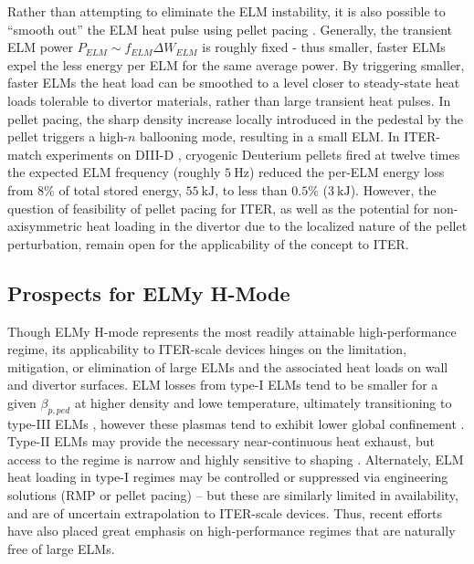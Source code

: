 Rather than attempting to eliminate the ELM instability, it is also possible to ``smooth out'' the ELM heat pulse using pellet pacing \cite{Baylor2013}.  Generally, the transient ELM power $P_{ELM} \sim f_{ELM} \Delta W_{ELM}$ is roughly fixed - thus smaller, faster ELMs expel the less energy per ELM for the same average power.  By triggering smaller, faster ELMs the heat load can be smoothed to a level closer to steady-state heat loads tolerable to divertor materials, rather than large transient heat pulses.  In pellet pacing, the sharp density increase locally introduced in the pedestal by the pellet triggers a high-$n$ ballooning mode, resulting in a small ELM.  In ITER-match experiments on DIII-D \cite{Baylor2013}, cryogenic Deuterium pellets fired at twelve times the expected ELM frequency (roughly $\SI{5}{\hertz}$) reduced the per-ELM energy loss from $8\%$ of total stored energy, $\SI{55}{\kilo\joule}$, to less than $0.5\%$ ($\SI{3}{\kilo\joule}$).  However, the question of feasibility of pellet 
pacing for ITER, as well as the potential for non-axisymmetric heat loading in the divertor due to the localized nature of the pellet perturbation, remain open for the applicability of the concept to ITER.

\subsection{Prospects for ELMy H-Mode}\label{subsec:hcr_elmy_prospects}

Though ELMy H-mode represents the most readily attainable high-performance regime, its applicability to ITER-scale devices hinges on the limitation, mitigation, or elimination of large ELMs and the associated heat loads on wall and divertor surfaces.  ELM losses from type-I ELMs tend to be smaller for a given $\beta_{p,ped}$ at higher density and lowe temperature, ultimately transitioning to type-III ELMs \cite{Urano2003}, however these plasmas tend to exhibit lower global confinement \cite{Saibene1999}.  Type-II ELMs may provide the necessary near-continuous heat exhaust, but access to the regime is narrow and highly sensitive to shaping \cite{Suttrop2003}.  Alternately, ELM heat loading in type-I regimes may be controlled or suppressed via engineering solutions (\ie RMP or pellet pacing) -- but these are similarly limited in availability, and are of uncertain extrapolation to ITER-scale devices.  Thus, recent efforts have also placed great emphasis on high-performance regimes that are naturally free of 
large ELMs.\nicesectionending

